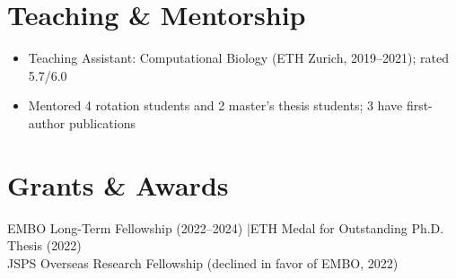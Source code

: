 \documentclass[11pt,a4paper]{article}
\begin{document}
\section{Teaching \& Mentorship}
\begin{itemize}
  \item Teaching Assistant: Computational Biology (ETH Zurich, 2019--2021); rated 5.7/6.0
  \item Mentored 4 rotation students and 2 master's thesis students; 3 have first-author publications
\end{itemize}

\section{Grants \& Awards}
EMBO Long-Term Fellowship (2022--2024) \quad|\quad ETH Medal for Outstanding Ph.D. Thesis (2022)\\
JSPS Overseas Research Fellowship (declined in favor of EMBO, 2022)
\end{document}
